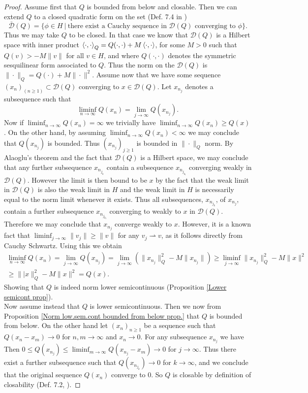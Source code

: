 \documentclass[a4paper,11pt]{article}
\newcommand{\dom}[1]{\mathscr D\left(#1\right)}
\numberwithin{equation}{section}
\begin{document}
\begin{proof}
	Assume first that $ Q $ is bounded from below and closable. Then we can extend $ Q $ to a closed quadratic form on the set (Def. 7.4 in \cite{JPS_lecturenotes})
	$$ \bar{\mathscr{D}}(Q)=\{\phi\in H\ |\ \text{there exist a Cauchy sequence in }\dom{Q}\text{ converging to }\phi \}. $$
	Thus we may take $ Q $ to be closed. In that case we know that $ \dom{Q} $ is a Hilbert space with inner product $ \braket{\cdot,\cdot}_Q=Q(\cdot,\cdot)+M\braket{\cdot,\cdot} $, for some $ M>0 $ such that $ Q(v)>-M\|v\| $ for all $ v\in H $, and where $ Q(\cdot,\cdot) $ denotes the symmetric sesquilinear form associated to $ Q $. Thus the norm on the $ \dom{Q} $ is $\|\cdot\|_Q= Q(\cdot)+M\|\cdot\|^2 $. Assume now that we have some sequence $ (x_n)_{(n\geq1)}\subset\dom{Q} $ converging to $ x\in\dom{Q} $. Let $ x_{n_j} $ denotes a subsequence such that $$ \liminf_{n\to\infty}Q(x_n)=\lim\limits_{j\to\infty}Q(x_{n_j}). $$
	Now if $ \liminf_{n\to\infty} Q(x_n)=\infty $ we trivially have $ \liminf_{n\to\infty} Q(x_n)\geq Q(x) $. On the other hand, by assuming $ \liminf_{n\to\infty} Q(x_n)<\infty $ we may conclude that $ Q(x_{n_j}) $ is bounded. Thus $ (x_{n_j})_{j\geq1} $ is bounded in $ \|\cdot\|_Q $ norm. By Alaoglu's theorem and the fact that $ \dom{Q} $ is a Hilbert space, we may conclude that any further subsequence $ x_{n_{j_k}} $ contain a subsequence $ x_{n_{j_{k_l}}} $ converging weakly in $ \dom{Q} $. However the limit is then bound to be $ x $ by the fact that the weak limit in $ \dom{Q} $ is also the weak limit in $ H $ and the weak limit in $ H $ is necessarily equal to the norm limit whenever it exists. Thus all subsequences, $ x_{n_{j_k}} $, of $ x_{n_j} $, contain a further subsequence $ x_{n_{j_{k_l}}} $ converging to weakly to $ x $ in $ \dom{Q} $. Therefore we may conclude that $x_{n_j}$ converge weakly to $ x $. However, it is a known fact that $ \liminf_{j\to\infty}\|v_j\|\geq\|v\| $ for any $ v_j\rightharpoonup v $, as it follows directly from Cauchy Schwartz. Using this we obtain \begin{equation}
	\begin{aligned}
	\liminf_{n\to\infty}Q(x_n)=\lim\limits_{j\to\infty}Q(x_{n_j})=\lim_{j\to\infty}\left(\|x_{n_j}\|_Q^2-M\|x_{n_j}\|\right)\geq\liminf_{j\to\infty}\|x_{n_j}\|_Q^2-M\|x\|^2\\\geq\||x\|_Q^2-M\|x\|^2=Q(x).
	\end{aligned}
	\end{equation}
	Showing that $ Q $ is indeed norm lower semicontinuous (Proposition \ref{Lower semicont prop}).\\
	Now assume instead that $ Q $ is lower semicontinuous. Then we now from Proposition \ref{Norm low.sem.cont bounded from below prop.} that $ Q $ is bounded from below. On the other hand let $ (x_n)_{n\geq1} $ be a sequence such that $ Q(x_n-x_m)\to0 $ for $ n,m\to\infty $ and $ x_n\to0 $. For any subsequence $ x_{n_j} $ we have Then $ 0\leq Q(x_{n_j})\leq\liminf_{m\to\infty}Q(x_{n_j}-x_m)\to 0 $ for $ j\to\infty $. Thus there exist a further subsequence such that $ Q(x_{n_{j_k}})\to0 $ for $ k\to\infty $, and we conclude that the original sequence $ Q(x_n) $ converge to $ 0 $. So $ Q $ is closable by definition of closability (Def. 7.2, \cite{JPS_lecturenotes}).
\end{proof}
\end{document}
